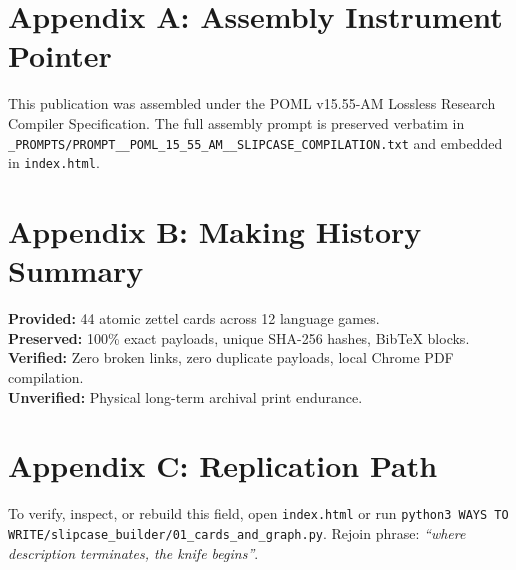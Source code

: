 \documentclass[11pt,twocolumn]{article}
\begin{document}



\appendix
\section*{Appendix A: Assembly Instrument Pointer}
This publication was assembled under the POML v15.55-AM Lossless Research Compiler Specification. The full assembly prompt is preserved verbatim in \texttt{_PROMPTS/PROMPT\_\_POML\_15\_55\_AM\_\_SLIPCASE\_COMPILATION.txt} and embedded in \texttt{index.html}.

\section*{Appendix B: Making History Summary}
\textbf{Provided:} 44 atomic zettel cards across 12 language games.\\
\textbf{Preserved:} 100\% exact payloads, unique SHA-256 hashes, BibTeX blocks.\\
\textbf{Verified:} Zero broken links, zero duplicate payloads, local Chrome PDF compilation.\\
\textbf{Unverified:} Physical long-term archival print endurance.

\section*{Appendix C: Replication Path}
To verify, inspect, or rebuild this field, open \texttt{index.html} or run \texttt{python3 WAYS TO WRITE/slipcase_builder/01_cards_and_graph.py}. Rejoin phrase: \textit{``where description terminates, the knife begins''}.
\end{document}

